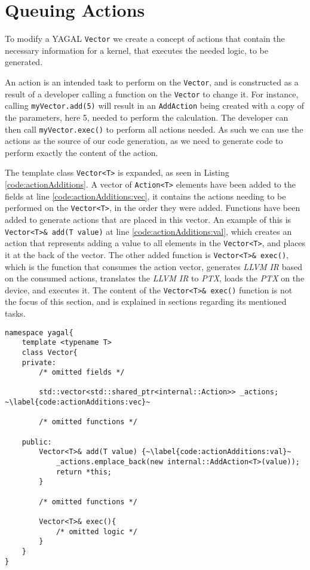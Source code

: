 \section{Queuing Actions} \label{cha:queueingActions}
To modify a YAGAL \texttt{Vector} we create a concept of actions that contain the necessary information for a kernel, that executes the needed logic, to be generated.

An action is an intended task to perform on the \texttt{Vector}, and is constructed as a result of a developer calling a function on the \texttt{Vector} to change it. For instance, calling \texttt{myVector.add(5)} will result in an \texttt{AddAction} being created with a copy of the parameters, here 5, needed to perform the calculation. The developer can then call \texttt{myVector.exec()} to perform all actions needed. As such we can use the actions as the source of our code generation, as we need to generate code to perform exactly the content of the action.

The template class \texttt{Vector<T>} is expanded, as seen in Listing \ref{code:actionAdditions}. A vector of \texttt{Action<T>} elements have been added to the fields at line \ref{code:actionAdditions:vec}, it contains the actions needing to be performed on the \texttt{Vector<T>}, in the order they were added. Functions have been added to generate actions that are placed in this vector. An example of this is \texttt{Vector<T>\& add(T value)} at line \ref{code:actionAdditions:val}, which creates an action that represents adding a value to all elements in the \texttt{Vector<T>}, and places it at the back of the vector. The other added function is \texttt{Vector<T>\& exec()}, which is the function that consumes the action vector, generates \textit{LLVM IR} based on the consumed actions, translates the \textit{LLVM IR} to \textit{PTX}, loads the \textit{PTX} on the device, and executes it. The content of the \texttt{Vector<T>\& exec()} function is not the focus of this section, and is explained in sections regarding its mentioned tasks.

\begin{lstlisting}[caption={Vector<T> action additions}, label={code:actionAdditions}]
namespace yagal{
    template <typename T>
    class Vector{
    private:
        /* omitted fields */

        std::vector<std::shared_ptr<internal::Action>> _actions; ~\label{code:actionAdditions:vec}~

        /* omitted functions */
    
    public:
        Vector<T>& add(T value) {~\label{code:actionAdditions:val}~
            _actions.emplace_back(new internal::AddAction<T>(value));
            return *this;
        }
        
        /* omitted functions */

        Vector<T>& exec(){
            /* omitted logic */
        }
    }
}
\end{lstlisting}

